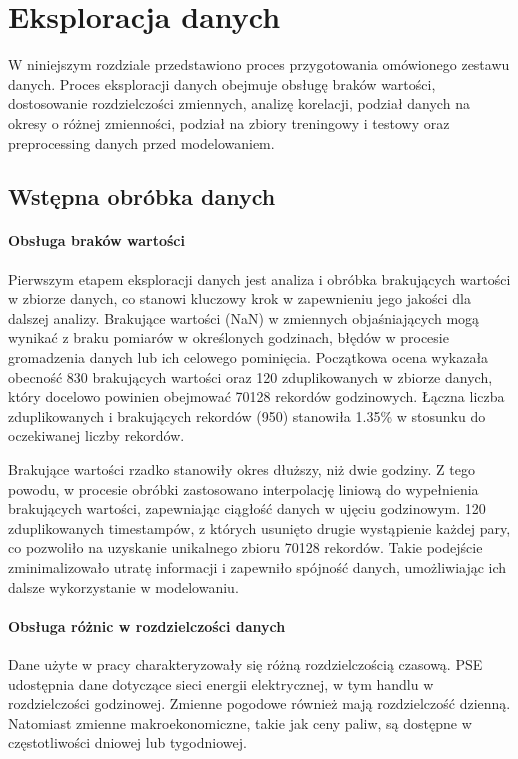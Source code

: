 \chapter{Eksploracja danych}
\label{sec:eksploracja}

W niniejszym rozdziale przedstawiono proces przygotowania omówionego zestawu danych. Proces eksploracji danych obejmuje obsługę braków wartości, dostosowanie rozdzielczości zmiennych, analizę korelacji, podział danych na okresy o różnej zmienności, podział na zbiory treningowy i testowy oraz preprocessing danych przed modelowaniem.

\section{Wstępna obróbka danych}
\subsubsection{Obsługa braków wartości}
Pierwszym etapem eksploracji danych jest analiza i obróbka brakujących wartości w zbiorze danych, co stanowi kluczowy krok w zapewnieniu jego jakości dla dalszej analizy. Brakujące wartości (NaN) w zmiennych objaśniających mogą wynikać z braku pomiarów w określonych godzinach, błędów w procesie gromadzenia danych lub ich celowego pominięcia. Początkowa ocena wykazała obecność 830 brakujących wartości oraz 120 zduplikowanych w zbiorze danych, który docelowo powinien obejmować 70128 rekordów godzinowych. Łączna liczba zduplikowanych i brakujących rekordów (950) stanowiła 1.35\% w stosunku do oczekiwanej liczby rekordów.

Brakujące wartości rzadko stanowiły okres dłuższy, niż dwie godziny. Z tego powodu, w procesie obróbki zastosowano interpolację liniową do wypełnienia brakujących wartości, zapewniając ciągłość danych w ujęciu godzinowym. 120 zduplikowanych timestampów, z których usunięto drugie wystąpienie każdej pary, co pozwoliło na uzyskanie unikalnego zbioru 70128 rekordów. Takie podejście zminimalizowało utratę informacji i zapewniło spójność danych, umożliwiając ich dalsze wykorzystanie w modelowaniu.

\subsubsection{Obsługa różnic w rozdzielczości danych}
Dane użyte w pracy charakteryzowały się różną rozdzielczością czasową. PSE udostępnia dane dotyczące sieci energii elektrycznej, w tym handlu w rozdzielczości godzinowej. Zmienne pogodowe również mają rozdzielczość dzienną. Natomiast zmienne makroekonomiczne, takie jak ceny paliw, są dostępne w częstotliwości dniowej lub tygodniowej.

